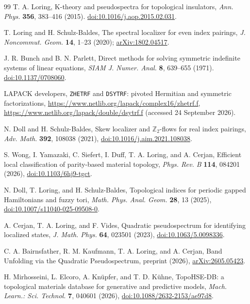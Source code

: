 \begin{thebibliography}{99}
T. A. Loring,
K-theory and pseudospectra for topological insulators,
\emph{Ann. Phys.} \textbf{356}, 383--416 (2015).
\href{https://doi.org/10.1016/j.aop.2015.02.031}{doi:10.1016/j.aop.2015.02.031}.

T. Loring and H. Schulz-Baldes,
The spectral localizer for even index pairings,
\emph{J. Noncommut. Geom.} \textbf{14}, 1--23 (2020);
\href{https://arxiv.org/abs/1802.04517}{arXiv:1802.04517}.

J. R. Bunch and B. N. Parlett,
Direct methods for solving symmetric indefinite systems of linear equations,
\emph{SIAM J. Numer. Anal.} \textbf{8}, 639--655 (1971).
\href{https://doi.org/10.1137/0708060}{doi:10.1137/0708060}.

LAPACK developers, \texttt{ZHETRF} and \texttt{DSYTRF}:
pivoted Hermitian and symmetric factorizations,
\url{https://www.netlib.org/lapack/complex16/zhetrf.f},
\url{https://www.netlib.org/lapack/double/dsytrf.f}
(accessed 24 September 2026).

N. Doll and H. Schulz-Baldes,
Skew localizer and $\mathbb Z_2$-flows for real index pairings,
\emph{Adv. Math.} \textbf{392}, 108038 (2021),
\href{https://doi.org/10.1016/j.aim.2021.108038}{doi:10.1016/j.aim.2021.108038}.

S. Wong, I. Yamazaki, C. Siefert, I. Duff, T. A. Loring, and A. Cerjan,
Efficient local classification of parity-based material topology,
\emph{Phys. Rev. B} \textbf{114}, 084201 (2026),
\href{https://doi.org/10.1103/6hj9-tgct}{doi:10.1103/6hj9-tgct}.

N. Doll, T. Loring, and H. Schulz-Baldes,
Topological indices for periodic gapped Hamiltonians and fuzzy tori,
\emph{Math. Phys. Anal. Geom.} \textbf{28}, 13 (2025),
\href{https://doi.org/10.1007/s11040-025-09508-0}{doi:10.1007/s11040-025-09508-0}.

A. Cerjan, T. A. Loring, and F. Vides,
Quadratic pseudospectrum for identifying localized states,
\emph{J. Math. Phys.} \textbf{64}, 023501 (2023),
\href{https://doi.org/10.1063/5.0098336}{doi:10.1063/5.0098336}.

C. A. Bairnsfather, R. M. Kaufmann, T. A. Loring, and A. Cerjan,
Band Unfolding via the Quadratic Pseudospectrum,
preprint (2026),
\href{https://doi.org/10.48550/arXiv.2605.05423}{arXiv:2605.05423}.

H. Mirhosseini, L. Elcoro, A. Kn\"upfer, and T. D. K\"uhne,
TopoHSE-DB: a topological materials database for generative and predictive models,
\emph{Mach. Learn.: Sci. Technol.} \textbf{7}, 040601 (2026),
\href{https://doi.org/10.1088/2632-2153/ae97d8}{doi:10.1088/2632-2153/ae97d8}.


\end{thebibliography}
